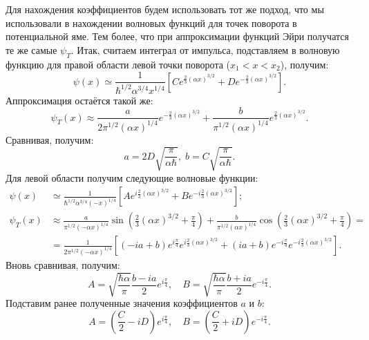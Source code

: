Для нахождения коэффициентов будем использовать тот же подход, что мы
использовали в нахождении волновых функций для точек поворота в потенциальной
яме. Тем более, что при аппроксимации функций Эйри получатся те же самые
$\psi_T$. Итак, считаем интеграл от импульса, подставляем в волновую функцию
для правой области левой точки поворота ($x_1 < x < x_2$), получим:
\[
  \psi(x) \simeq \frac{1}{\hbar^{1/2}\alpha^{3/4}x^{1/4}}\left[ Ce^{\frac{2}{3}(\alpha x)^{3/2}} + De^{-\frac{2}{3}(\alpha x)^{3/2}} \right].
\]
Аппроксимация остаётся такой же:
\[
  \psi_T(x) \approx \frac{a}{2\pi^{1/2}(\alpha x)^{1/4}}e^{-\frac{2}{3}(\alpha x)^{3/2}} + \frac{b}{\pi^{1/2}(\alpha x)^{1/4}}e^{\frac{2}{3}(\alpha x)^{3/2}}.
\]
Сравнивая, получим:
\[
  a = 2D\sqrt{\frac{\pi}{\alpha\hbar}},\; b = C\sqrt{\frac{\pi}{\alpha\hbar}}.
\]
Для левой области получим следующие волновые функции:
\begin{align*}
  \psi(x) &\simeq \frac{1}{\hbar^{1/2}\alpha^{3/4}(-x)^{1/4}}\left[ Ae^{i\frac{2}{3}(\alpha x)^{3/2}} + Be^{-i\frac{2}{3}(\alpha x)^{3/2}} \right];\\
  \psi_T(x) &\approx \frac{a}{\pi^{1/2}(-\alpha x)^{1/4}}\sin\left(\frac{2}{3}(\alpha x)^{3/2} + \frac{\pi}{4}\right) + \frac{b}{\pi^{1/2}(\alpha x)^{1/4}}\cos\left(\frac{2}{3}(\alpha x)^{3/2} + \frac{\pi}{4}\right) = \\
  & = \frac{1}{2\pi^{1/2}(-\alpha x)^{1/4}}\left[ (-ia + b)e^{i\frac{\pi}{4}}e^{i\frac{2}{3}(\alpha x)^{3/2}} + (ia+b)e^{-i\frac{\pi}{4}}e^{-i\frac{2}{3}(\alpha x)^{3/2}} \right].
\end{align*}
Вновь сравнивая, получим:
\[
  A = \sqrt{\frac{\hbar\alpha}{\pi}} \frac{b - ia}{2} e^{i\frac{\pi}{4}},\quad B = \sqrt{\frac{\hbar\alpha}{\pi}} \frac{b + ia}{2} e^{-i\frac{\pi}{4}}.
\]
Подставим ранее полученные значения коэффициентов $a$ и $b$:
\[
  A = \left( \frac{C}{2} - iD \right)e^{i\frac{\pi}{4}}, \quad B = \left( \frac{C}{2} + iD \right)e^{-i\frac{\pi}{4}}.
\]

